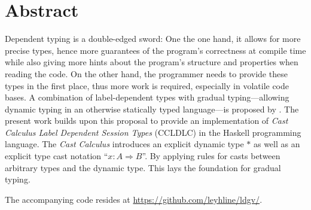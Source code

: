 \chapter*{Abstract}

Dependent typing is a double-edged sword: One the one hand, it allows for more precise types, hence more guarantees of the program's correctness at compile time while also giving more hints about the program's structure and properties when reading the code. On the other hand, the programmer needs to provide these types in the first place, thus more work is required, especially in volatile code bases. A combination of label-dependent types with gradual typing---allowing dynamic typing in an otherwise statically typed language---is proposed by \cite{fu2021}. The present work builds upon this proposal to provide an implementation of \emph{Cast Calculus Label Dependent Session Types} (CCLDLC) in the Haskell programming language. The \emph{Cast Calculus} introduces an explicit dynamic type $\ast$ as well as an explicit type cast notation ``$x : A \Rightarrow B$''. By applying rules for casts between arbitrary types and the dynamic type. This lays the foundation for gradual typing.

The accompanying code resides at \url{https://github.com/leyhline/ldgv/}.
